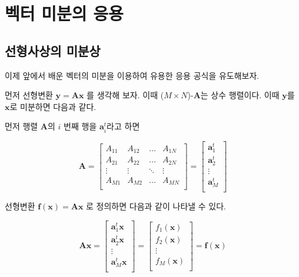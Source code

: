 \documentclass[
  11pt,
  a4paper,
  oneside]{scrbook}
\theoremstyle{definition}
\theoremstyle{plain}
\theoremstyle{definition}
\theoremstyle{definition}
\theoremstyle{remark}
\begin{document}
\section{벡터 미분의
응용}\label{uxbca1uxd130-uxbbf8uxbd84uxc758-uxc751uxc6a9}

\subsection{선형사상의
미분상}\label{uxc120uxd615uxc0acuxc0c1uxc758-uxbbf8uxbd84uxc0c1}

이제 앞에서 배운 벡터의 미분을 이용하여 유용한 응용 공식을 유도해보자.

먼저 선형변환 \(\pmb y = \pmb A \pmb x\) 를 생각해 보자. 이때
(\(M \times N\))-\(\pmb A\)는 상수 행렬이다. 이때 \(\pmb y\)를
\(\pmb x\)로 미분하면 다음과 같다.

먼저 행렬 \(\pmb A\)의 \(i\) 번째 행을 \(\pmb a_i^t\)라고 하면

\[
\pmb A = \begin{bmatrix}
A_{11} & A_{12} & \dots & A_{1N} \\
A_{21} & A_{22} & \dots & A_{2N} \\
\vdots & \vdots & \ddots & \vdots \\
A_{M1} & A_{M2} & \dots & A_{MN} \\
\end{bmatrix}=
\begin{bmatrix}
\pmb a_1^t  \\
\pmb a_2^t  \\
\vdots \\
\pmb a_M^t  \\
\end{bmatrix}
\]

선형변환 \(\pmb f(\pmb x) = \pmb A \pmb x\) 로 정의하면 다음과 같이
나타낼 수 있다.

\[
\pmb A \pmb x=
\begin{bmatrix}
\pmb a_1^t \pmb x \\
\pmb a_2^t \pmb x \\
\vdots \\
\pmb a_M^t \pmb x \\
\end{bmatrix} =
\begin{bmatrix}
f_1(\pmb x) \\
f_2(\pmb x) \\
\vdots \\
f_M(\pmb x) \\
\end{bmatrix} 
= \pmb f(\pmb x) 
\]
\end{document}

